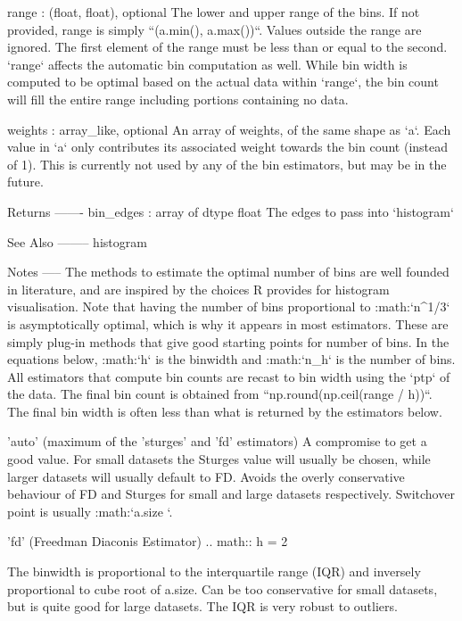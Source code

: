 \begin{DoxyVerb}
range : (float, float), optional
    The lower and upper range of the bins.  If not provided, range
    is simply ``(a.min(), a.max())``.  Values outside the range are
    ignored. The first element of the range must be less than or
    equal to the second. `range` affects the automatic bin
    computation as well. While bin width is computed to be optimal
    based on the actual data within `range`, the bin count will fill
    the entire range including portions containing no data.

weights : array_like, optional
    An array of weights, of the same shape as `a`.  Each value in
    `a` only contributes its associated weight towards the bin count
    (instead of 1). This is currently not used by any of the bin estimators,
    but may be in the future.

Returns
-------
bin_edges : array of dtype float
    The edges to pass into `histogram`

See Also
--------
histogram

Notes
-----
The methods to estimate the optimal number of bins are well founded
in literature, and are inspired by the choices R provides for
histogram visualisation. Note that having the number of bins
proportional to :math:`n^{1/3}` is asymptotically optimal, which is
why it appears in most estimators. These are simply plug-in methods
that give good starting points for number of bins. In the equations
below, :math:`h` is the binwidth and :math:`n_h` is the number of
bins. All estimators that compute bin counts are recast to bin width
using the `ptp` of the data. The final bin count is obtained from
``np.round(np.ceil(range / h))``. The final bin width is often less 
than what is returned by the estimators below.

'auto' (maximum of the 'sturges' and 'fd' estimators)
    A compromise to get a good value. For small datasets the Sturges
    value will usually be chosen, while larger datasets will usually
    default to FD.  Avoids the overly conservative behaviour of FD
    and Sturges for small and large datasets respectively.
    Switchover point is usually :math:`a.size `.

'fd' (Freedman Diaconis Estimator)
    .. math:: h = 2 

    The binwidth is proportional to the interquartile range (IQR)
    and inversely proportional to cube root of a.size. Can be too
    conservative for small datasets, but is quite good for large
    datasets. The IQR is very robust to outliers.


\end{DoxyVerb}
